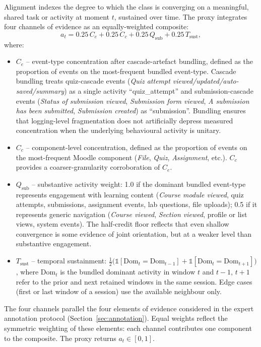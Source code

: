 \documentclass[preprint,12pt,authoryear]{elsarticle}
\begin{document}
Alignment indexes the degree to which the class is converging on a meaningful, shared task or activity at moment $t$, sustained over time. The proxy integrates four channels of evidence as an equally-weighted composite:
\begin{equation}
a_t = 0.25\,C_e + 0.25\,C_c + 0.25\,Q_{\mathrm{sub}} + 0.25\,T_{\mathrm{sust}},
\label{eq:alignment}
\end{equation}
where:
\begin{itemize}
\item $C_e$ -- event-type concentration after cascade-artefact bundling, defined as the proportion of events on the most-frequent bundled event-type. Cascade bundling treats quiz-cascade events (\textit{Quiz attempt viewed/updated/auto-saved/summary}) as a single activity ``quiz\_attempt'' and submission-cascade events (\textit{Status of submission viewed}, \textit{Submission form viewed}, \textit{A submission has been submitted}, \textit{Submission created}) as ``submission''. Bundling ensures that logging-level fragmentation does not artificially depress measured concentration when the underlying behavioural activity is unitary.
\item $C_c$ -- component-level concentration, defined as the proportion of events on the most-frequent Moodle component (\textit{File}, \textit{Quiz}, \textit{Assignment}, etc.). $C_c$ provides a coarser-granularity corroboration of $C_e$.
\item $Q_{\mathrm{sub}}$ -- substantive activity weight: 1.0 if the dominant bundled event-type represents engagement with learning content (\textit{Course module viewed}, quiz attempts, submissions, assignment events, lab questions, file uploads); 0.5 if it represents generic navigation (\textit{Course viewed}, \textit{Section viewed}, profile or list views, system events). The half-credit floor reflects that even shallow convergence is some evidence of joint orientation, but at a weaker level than substantive engagement.
\item $T_{\mathrm{sust}}$ -- temporal sustainment: $\frac{1}{2}\bigl(\mathbb{1}[\mathrm{Dom}_t = \mathrm{Dom}_{t-1}] + \mathbb{1}[\mathrm{Dom}_t = \mathrm{Dom}_{t+1}]\bigr)$, where $\mathrm{Dom}_t$ is the bundled dominant activity in window $t$ and $t-1$, $t+1$ refer to the prior and next retained windows in the same session. Edge cases (first or last window of a session) use the available neighbour only.
\end{itemize}
The four channels parallel the four elements of evidence considered in the expert annotation protocol (Section~\ref{sec:annotation}). Equal weights reflect the symmetric weighting of these elements: each channel contributes one component to the composite. The proxy returns $a_t \in [0,1]$.
\end{document}

